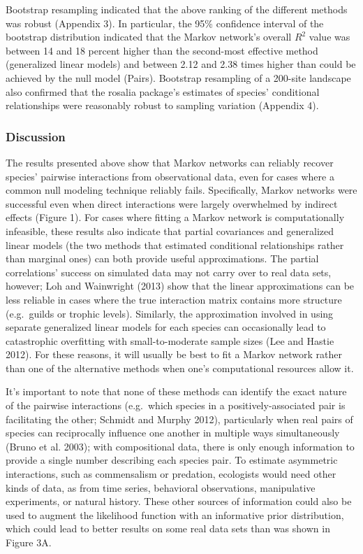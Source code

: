 \documentclass[12pt,]{article}
\begin{document}
\begin{spacing}{1.9}
\begin{flushleft}
Bootstrap resampling indicated that the above ranking of the different
methods was robust (Appendix 3). In particular, the 95\% confidence
interval of the bootstrap distribution indicated that the Markov
network's overall \(R^2\) value was between 14 and 18 percent higher
than the second-most effective method (generalized linear models) and
between 2.12 and 2.38 times higher than could be achieved by the null
model (Pairs). Bootstrap resampling of a 200-site landscape also
confirmed that the rosalia package's estimates of species' conditional
relationships were reasonably robust to sampling variation (Appendix 4).

\subsubsection{Discussion}\label{discussion}

The results presented above show that Markov networks can reliably
recover species' pairwise interactions from observational data, even for
cases where a common null modeling technique reliably fails.
Specifically, Markov networks were successful even when direct
interactions were largely overwhelmed by indirect effects (Figure 1).
For cases where fitting a Markov network is computationally infeasible,
these results also indicate that partial covariances and generalized
linear models (the two methods that estimated conditional relationships
rather than marginal ones) can both provide useful approximations. The
partial correlations' success on simulated data may not carry over to
real data sets, however; Loh and Wainwright (2013) show that the linear
approximations can be less reliable in cases where the true interaction
matrix contains more structure (e.g.~guilds or trophic levels).
Similarly, the approximation involved in using separate generalized
linear models for each species can occasionally lead to catastrophic
overfitting with small-to-moderate sample sizes (Lee and Hastie 2012).
For these reasons, it will usually be best to fit a Markov network
rather than one of the alternative methods when one's computational
resources allow it.

It's important to note that none of these methods can identify the exact
nature of the pairwise interactions (e.g.~which species in a
positively-associated pair is facilitating the other; Schmidt and Murphy
2012), particularly when real pairs of species can reciprocally
influence one another in multiple ways simultaneously (Bruno et al.
2003); with compositional data, there is only enough information to
provide a single number describing each species pair. To estimate
asymmetric interactions, such as commensalism or predation, ecologists
would need other kinds of data, as from time series, behavioral
observations, manipulative experiments, or natural history. These other
sources of information could also be used to augment the likelihood
function with an informative prior distribution, which could lead to
better results on some real data sets than was shown in Figure 3A.


\end{flushleft}
\end{spacing}
\end{document}
